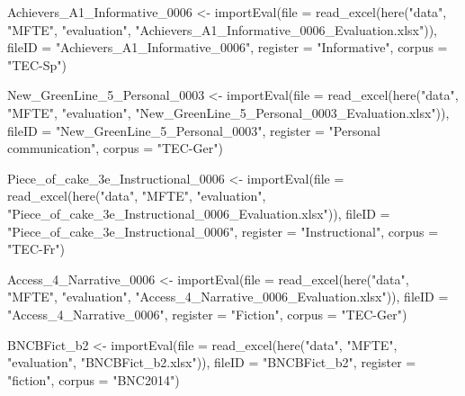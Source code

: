 \documentclass[
  letterpaper,
  DIV=11,
  numbers=noendperiod]{scrreprt}
\newenvironment{Shaded}{\begin{snugshade}}{\end{snugshade}}
\newcommand{\AttributeTok}[1]{\textcolor[rgb]{0.40,0.45,0.13}{#1}}
\newcommand{\FunctionTok}[1]{\textcolor[rgb]{0.28,0.35,0.67}{#1}}
\newcommand{\NormalTok}[1]{\textcolor[rgb]{0.00,0.23,0.31}{#1}}
\newcommand{\OtherTok}[1]{\textcolor[rgb]{0.00,0.23,0.31}{#1}}
\newcommand{\StringTok}[1]{\textcolor[rgb]{0.13,0.47,0.30}{#1}}
\begin{document}
\begin{Shaded}
\begin{Highlighting}[]
\NormalTok{Achievers\_A1\_Informative\_0006 }\OtherTok{\textless{}{-}} \FunctionTok{importEval}\NormalTok{(}\AttributeTok{file =} \FunctionTok{read\_excel}\NormalTok{(}\FunctionTok{here}\NormalTok{(}\StringTok{"data"}\NormalTok{, }\StringTok{"MFTE"}\NormalTok{, }\StringTok{"evaluation"}\NormalTok{, }\StringTok{"Achievers\_A1\_Informative\_0006\_Evaluation.xlsx"}\NormalTok{)), }\AttributeTok{fileID =} \StringTok{"Achievers\_A1\_Informative\_0006"}\NormalTok{, }\AttributeTok{register =} \StringTok{"Informative"}\NormalTok{, }\AttributeTok{corpus =} \StringTok{"TEC{-}Sp"}\NormalTok{)}

\NormalTok{New\_GreenLine\_5\_Personal\_0003 }\OtherTok{\textless{}{-}} \FunctionTok{importEval}\NormalTok{(}\AttributeTok{file =} \FunctionTok{read\_excel}\NormalTok{(}\FunctionTok{here}\NormalTok{(}\StringTok{"data"}\NormalTok{, }\StringTok{"MFTE"}\NormalTok{, }\StringTok{"evaluation"}\NormalTok{, }\StringTok{"New\_GreenLine\_5\_Personal\_0003\_Evaluation.xlsx"}\NormalTok{)), }\AttributeTok{fileID =} \StringTok{"New\_GreenLine\_5\_Personal\_0003"}\NormalTok{, }\AttributeTok{register =} \StringTok{"Personal communication"}\NormalTok{, }\AttributeTok{corpus =} \StringTok{"TEC{-}Ger"}\NormalTok{)}

\NormalTok{Piece\_of\_cake\_3e\_Instructional\_0006 }\OtherTok{\textless{}{-}} \FunctionTok{importEval}\NormalTok{(}\AttributeTok{file =} \FunctionTok{read\_excel}\NormalTok{(}\FunctionTok{here}\NormalTok{(}\StringTok{"data"}\NormalTok{, }\StringTok{"MFTE"}\NormalTok{, }\StringTok{"evaluation"}\NormalTok{, }\StringTok{"Piece\_of\_cake\_3e\_Instructional\_0006\_Evaluation.xlsx"}\NormalTok{)), }\AttributeTok{fileID =} \StringTok{"Piece\_of\_cake\_3e\_Instructional\_0006"}\NormalTok{, }\AttributeTok{register =} \StringTok{"Instructional"}\NormalTok{, }\AttributeTok{corpus =} \StringTok{"TEC{-}Fr"}\NormalTok{)}

\NormalTok{Access\_4\_Narrative\_0006 }\OtherTok{\textless{}{-}} \FunctionTok{importEval}\NormalTok{(}\AttributeTok{file =} \FunctionTok{read\_excel}\NormalTok{(}\FunctionTok{here}\NormalTok{(}\StringTok{"data"}\NormalTok{, }\StringTok{"MFTE"}\NormalTok{, }\StringTok{"evaluation"}\NormalTok{, }\StringTok{"Access\_4\_Narrative\_0006\_Evaluation.xlsx"}\NormalTok{)), }\AttributeTok{fileID =} \StringTok{"Access\_4\_Narrative\_0006"}\NormalTok{, }\AttributeTok{register =} \StringTok{"Fiction"}\NormalTok{, }\AttributeTok{corpus =} \StringTok{"TEC{-}Ger"}\NormalTok{)}

\NormalTok{BNCBFict\_b2 }\OtherTok{\textless{}{-}} \FunctionTok{importEval}\NormalTok{(}\AttributeTok{file =} \FunctionTok{read\_excel}\NormalTok{(}\FunctionTok{here}\NormalTok{(}\StringTok{"data"}\NormalTok{, }\StringTok{"MFTE"}\NormalTok{, }\StringTok{"evaluation"}\NormalTok{, }\StringTok{"BNCBFict\_b2.xlsx"}\NormalTok{)), }\AttributeTok{fileID =} \StringTok{"BNCBFict\_b2"}\NormalTok{, }\AttributeTok{register =} \StringTok{"fiction"}\NormalTok{, }\AttributeTok{corpus =} \StringTok{"BNC2014"}\NormalTok{)}


\end{Highlighting}
\end{Shaded}
\end{document}
